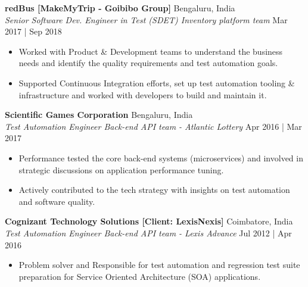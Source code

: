 \documentclass[a4paper]{article}
\begin{document}
\textbf{redBus [MakeMyTrip - Goibibo Group]} \hfill Bengaluru, India\\
\textit{Senior Software Dev. Engineer in Test (SDET) \textbar{} Inventory platform team} \hfill Mar 2017 | Sep 2018\\
\vspace{-1.5mm}
\begin{itemize} \itemsep 1pt
	\item Worked with Product \& Development teams to understand the business needs and identify the quality requirements and test automation goals.
	\item Supported Continuous Integration efforts, set up test automation tooling \& infrastructure and worked with developers to build and maintain it.
\end{itemize}

\textbf{Scientific Games Corporation} \hfill Bengaluru, India\\
\textit{Test Automation Engineer \textbar{} Back-end API team - Atlantic Lottery} \hfill Apr 2016 | Mar 2017\\
\vspace{-1.5mm}
\begin{itemize} \itemsep 1pt
	\item Performance tested the core back-end systems (microservices) and involved in strategic discussions on application performance tuning.
	\item Actively contributed to the tech strategy with insights on test automation and software quality.
\end{itemize}

\textbf{Cognizant Technology Solutions [Client: LexisNexis]} \hfill Coimbatore, India\\
\textit{Test Automation Engineer \textbar{} Back-end API team - Lexis Advance} \hfill Jul 2012 | Apr 2016\\
\vspace{-1.5mm}
\begin{itemize} \itemsep 1pt
	\item Problem solver and Responsible for test automation and regression test suite preparation for Service Oriented Architecture (SOA) applications. 
\end{itemize}
\end{document}
